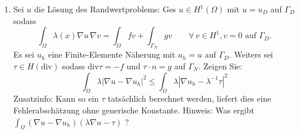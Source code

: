 \documentclass[11pt,a4paper]{report}
\newcommand{\diver}{\text{div}}
\begin{document}
\begin{enumerate}
\item Sei $u$ die L\"osung des Randwertproblems: Ges $u \in
  H^1(\Omega)$ mit $u = u_D$ auf $\Gamma_D$ sodass
$$
\int_\Omega \lambda(x) \nabla u \, \nabla v = \int_\Omega f v +
\int_{\Gamma_N} g v  \qquad \forall \, v \in H^1, v = 0 \text{ auf } \Gamma_D.
$$
Es sei $u_h$ eine Finite-Elemente N\"aherung mit $u_h = u$ auf
$\Gamma_D$. Weiters sei $\tau \in H(\diver)$ sodass $\diver \tau = - f$
und $\tau \cdot n = g$ auf $\Gamma_N$. Zeigen Sie:
$$
\int_\Omega \lambda | \nabla u - \nabla u_h |^2 \leq \int_\Omega
\lambda | \nabla u_h - \lambda^{-1} \tau |^2 
$$
Zusatzinfo: Kann so ein $\tau$ tats\"achlich berechnet werden, liefert dies eine
Fehlerabsch\"atzung ohne generische Konstante. \newline
Hinweis: Was ergibt $\int_\Omega (\nabla u - \nabla u_h) ( \lambda
\nabla u - \tau)$ ?
\end{enumerate}
\end{document}
